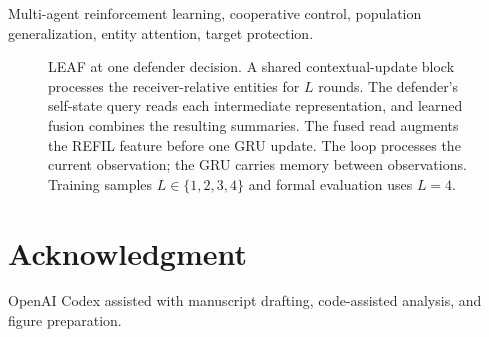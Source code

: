 \documentclass[journal,10pt]{IEEEtran}
\begin{document}
\par
\begin{IEEEkeywords}
Multi-agent reinforcement learning, cooperative control, population generalization, entity attention, target protection.
\end{IEEEkeywords}



\begin{figure}[!t]
\centering
\resizebox{\textwidth}{!}{}
\caption{LEAF at one defender decision. A shared contextual-update block processes the receiver-relative entities for $L$ rounds. The defender's self-state query reads each intermediate representation, and learned fusion combines the resulting summaries. The fused read augments the REFIL feature before one GRU update. The loop processes the current observation; the GRU carries memory between observations. Training samples $L\in\{1,2,3,4\}$ and formal evaluation uses $L=4$.}
\label{fig:framework}
\end{figure}


\FloatBarrier

\section*{Acknowledgment}
OpenAI Codex assisted with manuscript drafting, code-assisted analysis, and figure preparation.


\end{document}
